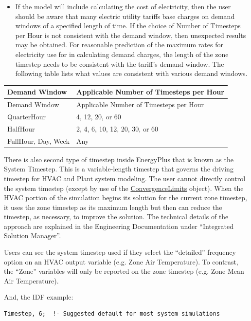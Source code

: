 \begin{itemize}
\item
  If the model will include calculating the cost of electricity, then the user should be aware that many electric utility tariffs base charges on demand windows of a specified length of time. If the choice of Number of Timesteps per Hour is not consistent with the demand window, then unexpected results may be obtained. For reasonable prediction of the maximum rates for electricity use for in calculating demand charges, the length of the zone timestep needs to be consistent with the tariff's demand window. The following table lists what values are consistent with various demand windows.
\end{itemize}

\begin{longtable}[c]{@{}ll@{}}
\toprule
Demand Window & Applicable Number of Timesteps per Hour \tabularnewline
\midrule
\endfirsthead

\toprule
Demand Window & Applicable Number of Timesteps per Hour \tabularnewline
\midrule
\endhead

QuarterHour & 4, 12, 20, or 60 \tabularnewline
HalfHour & 2, 4, 6, 10, 12, 20, 30, or 60 \tabularnewline
FullHour, Day, Week & Any \tabularnewline
\bottomrule
\end{longtable}

There is also second type of timestep inside EnergyPlus that is known as the System Timestep. This is a variable-length timestep that governs the driving timestep for HVAC and Plant system modeling. The user cannot directly control the system timestep (except by use of the \hyperref[convergencelimits]{ConvergenceLimits} object). When the HVAC portion of the simulation begins its solution for the current zone timestep, it uses the zone timestep as its maximum length but then can reduce the timestep, as necessary, to improve the solution.  The technical details of the approach are explained in the Engineering Documentation under ``Integrated Solution Manager''.

Users can see the system timestep used if they select the ``detailed'' frequency option on an HVAC output variable (e.g. Zone Air Temperature). To contrast, the ``Zone'' variables will only be reported on the zone timestep (e.g. Zone Mean Air Temperature).

And, the IDF example:

\begin{lstlisting}
Timestep, 6;  !- Suggested default for most system simulations
\end{lstlisting}

